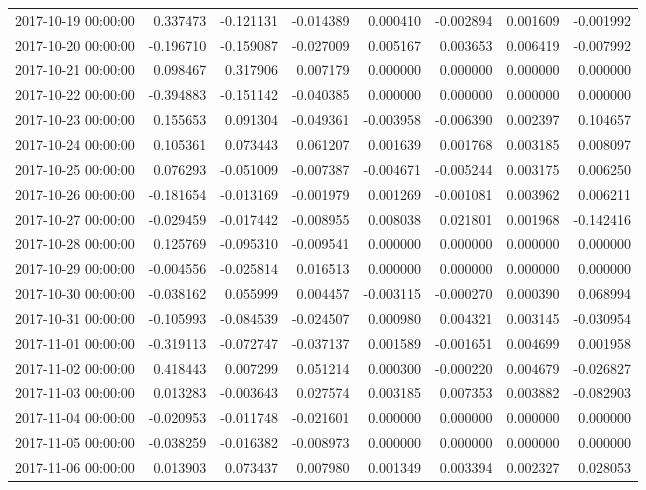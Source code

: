 \begin{tabular}{lrrrrrrr}
2017-10-19 00:00:00 & 0.337473 & -0.121131 & -0.014389 & 0.000410 & -0.002894 & 0.001609 & -0.001992 \\
2017-10-20 00:00:00 & -0.196710 & -0.159087 & -0.027009 & 0.005167 & 0.003653 & 0.006419 & -0.007992 \\
2017-10-21 00:00:00 & 0.098467 & 0.317906 & 0.007179 & 0.000000 & 0.000000 & 0.000000 & 0.000000 \\
2017-10-22 00:00:00 & -0.394883 & -0.151142 & -0.040385 & 0.000000 & 0.000000 & 0.000000 & 0.000000 \\
2017-10-23 00:00:00 & 0.155653 & 0.091304 & -0.049361 & -0.003958 & -0.006390 & 0.002397 & 0.104657 \\
2017-10-24 00:00:00 & 0.105361 & 0.073443 & 0.061207 & 0.001639 & 0.001768 & 0.003185 & 0.008097 \\
2017-10-25 00:00:00 & 0.076293 & -0.051009 & -0.007387 & -0.004671 & -0.005244 & 0.003175 & 0.006250 \\
2017-10-26 00:00:00 & -0.181654 & -0.013169 & -0.001979 & 0.001269 & -0.001081 & 0.003962 & 0.006211 \\
2017-10-27 00:00:00 & -0.029459 & -0.017442 & -0.008955 & 0.008038 & 0.021801 & 0.001968 & -0.142416 \\
2017-10-28 00:00:00 & 0.125769 & -0.095310 & -0.009541 & 0.000000 & 0.000000 & 0.000000 & 0.000000 \\
2017-10-29 00:00:00 & -0.004556 & -0.025814 & 0.016513 & 0.000000 & 0.000000 & 0.000000 & 0.000000 \\
2017-10-30 00:00:00 & -0.038162 & 0.055999 & 0.004457 & -0.003115 & -0.000270 & 0.000390 & 0.068994 \\
2017-10-31 00:00:00 & -0.105993 & -0.084539 & -0.024507 & 0.000980 & 0.004321 & 0.003145 & -0.030954 \\
2017-11-01 00:00:00 & -0.319113 & -0.072747 & -0.037137 & 0.001589 & -0.001651 & 0.004699 & 0.001958 \\
2017-11-02 00:00:00 & 0.418443 & 0.007299 & 0.051214 & 0.000300 & -0.000220 & 0.004679 & -0.026827 \\
2017-11-03 00:00:00 & 0.013283 & -0.003643 & 0.027574 & 0.003185 & 0.007353 & 0.003882 & -0.082903 \\
2017-11-04 00:00:00 & -0.020953 & -0.011748 & -0.021601 & 0.000000 & 0.000000 & 0.000000 & 0.000000 \\
2017-11-05 00:00:00 & -0.038259 & -0.016382 & -0.008973 & 0.000000 & 0.000000 & 0.000000 & 0.000000 \\
2017-11-06 00:00:00 & 0.013903 & 0.073437 & 0.007980 & 0.001349 & 0.003394 & 0.002327 & 0.028053 \\

\end{tabular}
